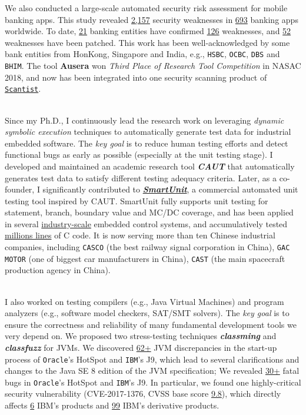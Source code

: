 \documentclass[margin]{res}
\begin{document}
\begin{resume}
We also conducted a large-scale automated security risk assessment for mobile banking apps. This study revealed \underline{2,157} security weaknesses in \underline{693} banking apps worldwide. To date, \underline{21} banking entities have confirmed \underline{126} weaknesses, and \underline{52} weaknesses have been patched. This work has been well-acknowledged by some bank entities from HonKong, Singapore and India, e.g., \texttt{HSBC}, \texttt{OCBC}, \texttt{DBS} and \texttt{BHIM}. The tool \textbf{Ausera} won \emph{Third Place of Research Tool Competition} in NASAC 2018, and now has been integrated into one security scanning product of \href{https://scantist.com/}{\texttt{Scantist}}. 

\\
Since my Ph.D., I continuously lead the research work on leveraging \emph{dynamic symbolic execution} techniques to automatically generate test data for industrial embedded software. The \emph{key goal} is to reduce human testing efforts and detect functional bugs as early as possible (especially at the unit testing stage).
I developed and maintained an academic research tool \textbf{\emph{CAUT}} that automatically generates test data to satisfy different testing adequacy criteria. Later, as a co-founder, I significantly contributed to \textbf{\emph{\href{http://180.167.177.62:1111}{SmartUnit}}}, a commercial automated unit testing tool inspired by CAUT. SmartUnit fully supports unit testing for statement, branch, boundary value and MC/DC coverage, and has been applied in several \underline{industry-scale} embedded control systems, and accumulatively tested \underline{millions lines} of C code.  
It is now serving more than ten Chinese industrial companies, including \texttt{CASCO} (the best railway signal
corporation in China), \texttt{GAC MOTOR} (one of biggest car manufacturers in China), \texttt{CAST} (the main spacecraft production agency in China). 

\\
I also worked on testing compilers (e.g., Java Virtual Machines) and program analyzers (e.g., software model checkers, SAT/SMT solvers). The \emph{key goal} is to ensure the correctness and reliability of many fundamental development tools we very depend on.
We proposed two stress-testing techniques \emph{\textbf{classming}} and \emph{\textbf{classfuzz}} for JVMs. We discovered \underline{62+} JVM discrepancies in the start-up process of \texttt{Oracle}'s HotSpot and \texttt{IBM}'s J9, which lead to  several clarifications and changes to the Java SE 8 edition of the JVM specification; We revealed \underline{30+} fatal bugs in \texttt{Oracle}'s HotSpot and \texttt{IBM}'s J9. In particular, we found one highly-critical security vulnerability (CVE-2017-1376, CVSS base score \underline{9.8}), which directly affects \underline{6} IBM's products and \underline{99} IBM's derivative products.


\end{resume}
\end{document}
